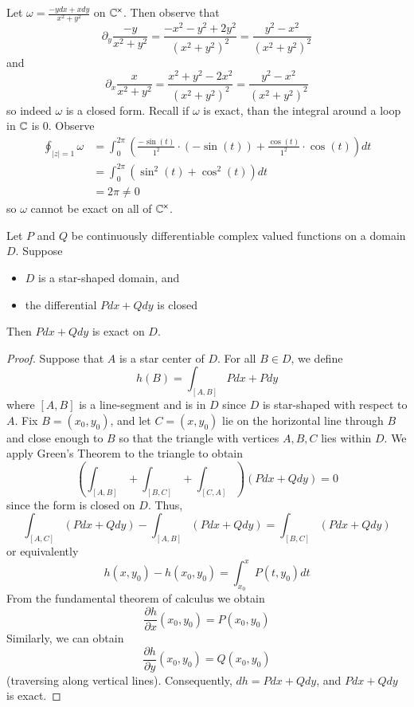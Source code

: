 \documentclass[12pt, a4paper, oneside, openright, titlepage]{book}
\begin{document}
\begin{eg}
    Let $\omega = \frac{-ydx + xdy}{x^2+y^2}$ on $\mathbb C^{\times}$. Then observe that $$\partial_y\frac{-y}{x^2+y^2} = \frac{-x^2-y^2 + 2y^2}{(x^2+y^2)^2} = \frac{y^2-x^2}{(x^2+y^2)^2}$$ and $$\partial_x\frac{x}{x^2+y^2} = \frac{x^2+y^2 - 2x^2}{(x^2+y^2)^2} = \frac{y^2-x^2}{(x^2+y^2)^2}$$
    so indeed $\omega$ is a closed form. Recall if $\omega$ is exact, than the integral around a loop in $\mathbb C$ is $0$. Observe \begin{align*}
        \oint_{|z|=1}\omega &= \int_{0}^{2\pi}\left(\frac{-\sin(t)}{1^2}\cdot (-\sin(t))+\frac{\cos(t)}{1^2}\cdot \cos(t)\right)dt \\
        &= \int_{0}^{2\pi}(\sin^2(t)+\cos^2(t))dt \\
        &= 2\pi \neq 0
    \end{align*}
    so $\omega$ cannot be exact on all of $\mathbb C^{\times}$.
\end{eg}


\begin{thm}
    Let $P$ and $Q$ be continuously differentiable complex valued functions on a domain $D$. Suppose \begin{itemize}
        \item $D$ is a star-shaped domain, and 
        \item the differential $Pdx+Qdy$ is closed
    \end{itemize}
    Then $Pdx+Qdy$ is exact on $D$.
\end{thm}
\begin{proof}
    Suppose that $A$ is a star center of $D$. For all $B \in D$, we define \begin{equation*}
        h(B) = \int_{[A,B]}Pdx+Pdy
    \end{equation*}
    where $[A,B]$ is a line-segment and is in $D$ since $D$ is star-shaped with respect to $A$. Fix $B = (x_0, y_0)$, and let $C = (x,y_0)$ lie on the horizontal line through $B$ and close enough to $B$ so that the triangle with vertices $A, B, C$ lies within $D$. We apply Green's Theorem to the triangle to obtain \begin{equation*}
        \left(\int_{[A,B]} + \int_{[B,C]}+\int_{[C,A]}\right)(Pdx+Qdy) = 0
    \end{equation*}
    since the form is closed on $D$. Thus, \begin{equation*}
        \int_{[A,C]}(Pdx+Qdy)-\int_{[A,B]}(Pdx+Qdy) = \int_{[B,C]}(Pdx+Qdy)
    \end{equation*}
    or equivalently \begin{equation*}
        h(x,y_0) - h(x_0,y_0) = \int_{x_0}^xP(t,y_0)dt
    \end{equation*}
    From the fundamental theorem of calculus we obtain \begin{equation*}
        \frac{\partial h}{\partial x}(x_0,y_0) = P(x_0,y_0)
    \end{equation*}
    Similarly, we can obtain \begin{equation*}
        \frac{\partial h}{\partial y}(x_0,y_0) = Q(x_0,y_0)
    \end{equation*}
    (traversing along vertical lines). Consequently, $dh = Pdx+Qdy$, and $Pdx+Qdy$ is exact.
\end{proof}
\end{document}
